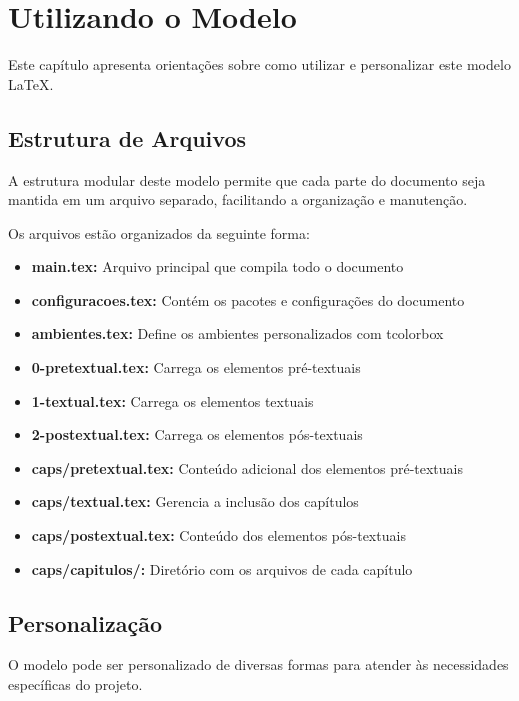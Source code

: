 \chapter{Utilizando o Modelo}

Este capítulo apresenta orientações sobre como utilizar e personalizar este modelo LaTeX.

\section{Estrutura de Arquivos}

A estrutura modular deste modelo permite que cada parte do documento seja mantida em um arquivo separado, facilitando a organização e manutenção.

\begin{highlight}
Os arquivos estão organizados da seguinte forma:
\begin{itemize}
    \item \textbf{main.tex:} Arquivo principal que compila todo o documento
    \item \textbf{configuracoes.tex:} Contém os pacotes e configurações do documento
    \item \textbf{ambientes.tex:} Define os ambientes personalizados com tcolorbox
    \item \textbf{0-pretextual.tex:} Carrega os elementos pré-textuais
    \item \textbf{1-textual.tex:} Carrega os elementos textuais
    \item \textbf{2-postextual.tex:} Carrega os elementos pós-textuais
    \item \textbf{caps/pretextual.tex:} Conteúdo adicional dos elementos pré-textuais
    \item \textbf{caps/textual.tex:} Gerencia a inclusão dos capítulos
    \item \textbf{caps/postextual.tex:} Conteúdo dos elementos pós-textuais
    \item \textbf{caps/capitulos/:} Diretório com os arquivos de cada capítulo
\end{itemize}
\end{highlight}

\section{Personalização}

O modelo pode ser personalizado de diversas formas para atender às necessidades específicas do projeto.

